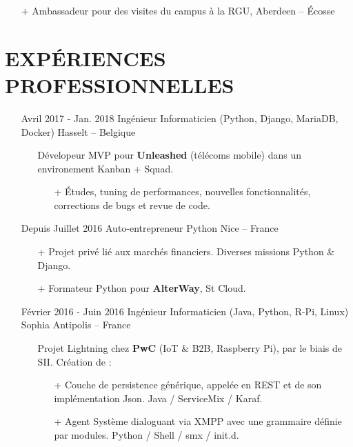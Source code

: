 \documentclass{res}
\begin{document}
\begin{resume}
\begin{itemize}
\begin{itemize}
                  \item[+]  Ambassadeur pour des visites du campus \`a la RGU, Aberdeen -- \'Ecosse
		\end{itemize} 
	\end{itemize}
	
\section{EXP\'ERIENCES PROFESSIONNELLES}

	\begin{itemize}
		\item[] Avril 2017 - Jan. 2018 \tabto{5cm} Ing\'enieur Informaticien (Python, Django, MariaDB, Docker) \hfill Hasselt -- Belgique
		\begin{itemize}
			\item[] D\'evelopeur MVP pour \textbf{Unleashed} (t\'el\'ecoms mobile) dans un environement Kanban + Squad.
			\begin{itemize}
				\item[+] \'Etudes, tuning de performances, nouvelles fonctionnalit\'es, corrections de bugs et revue de code.
			\end{itemize}
		\end{itemize}
		\item[] Depuis Juillet 2016 \tabto{5cm} Auto-entrepreneur Python \hfill Nice -- France
		\begin{itemize}
			\item[+] Projet priv\'e li\'e aux march\'es financiers. Diverses missions Python \& Django.
			\item[+] Formateur Python pour \textbf{AlterWay}, St Cloud. 
		\end{itemize}
		\item[] F\'evrier 2016 - Juin 2016 \tabto{5cm} Ing\'enieur Informaticien (Java, Python, R-Pi, Linux) \hfill Sophia Antipolis -- France
		\begin{itemize}
			\item[] Projet Lightning chez \textbf{PwC} (IoT \& B2B, Raspberry Pi), par le biais de SII. Cr\'eation de :
			\begin{itemize}
				\item[+] Couche de persistence g\'en\'erique, appel\'ee en REST et de son impl\'ementation Json. Java / ServiceMix / Karaf.
				\item[+] Agent Syst\`eme dialoguant via XMPP avec une grammaire d\'efinie par modules. Python / Shell / smx / init.d.

\end{itemize}
\end{itemize}
\end{itemize}
\end{resume}
\end{document}
